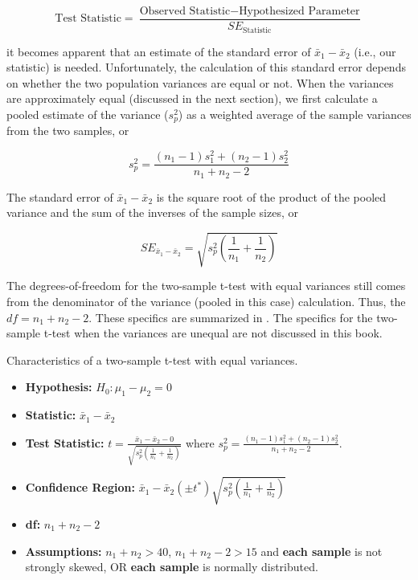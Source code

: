 \documentclass[10pt,openany]{book}\usepackage[]{graphicx}\usepackage[]{color}
\begin{document}
\[ \text{Test Statistic} = \frac{\text{Observed Statistic}-\text{Hypothesized Parameter}}{SE_{\text{Statistic}}} \]

it becomes apparent that an estimate of the standard error of $\bar{x}_{1}-\bar{x}_{2}$ (i.e., our statistic) is needed.  Unfortunately, the calculation of this standard error depends on whether the two population variances are equal or not.  When the variances are approximately equal (discussed in the next section), we first calculate a pooled estimate of the variance ($s_{p}^{2}$) as a weighted average of the sample variances from the two samples, or

\[s_{p}^{2}=\frac{(n_{1}-1)s_{1}^{2}+(n_{2}-1)s_{2}^{2}}{n_{1}+n_{2}-2} \]


The standard error of $\bar{x}_{1}-\bar{x}_{2}$ is the square root of the product of the pooled variance and the sum of the inverses of the sample sizes, or

\[ SE_{\bar{x}_{1}-\bar{x}_{2}}= \sqrt{s_{p}^{2}\left(\frac{1}{n_{1}}+\frac{1}{n_{2}} \right)}  \]

The degrees-of-freedom for the two-sample t-test with equal variances still comes from the denominator of the variance (pooled in this case) calculation. Thus, the $df=n_{1}+n_{2}-2$.  These specifics are summarized in . The specifics for the two-sample t-test when the variances are unequal are not discussed in this book.

\begin{table}[htbp]
  \caption{Characteristics of a two-sample t-test with equal variances.}
  \label{tab:2tspec}
    \begin{itemize}
      \item \textbf{Hypothesis:} $H_{0}:\mu_{1}-\mu_{2}=0$
      \item \textbf{Statistic:} $\bar{x}_{1}-\bar{x}_{2}$
      \item \textbf{Test Statistic:} $t=\frac{\bar{x}_{1}-\bar{x}_{2}-0}{\sqrt{s_{p}^{2}\left(\frac{1}{n_{1}}+\frac{1}{n_{2}} \right)}}$ where $s_{p}^{2}=\frac{(n_{1}-1)s_{1}^{2}+(n_{2}-1)s_{2}^{2}}{n_{1}+n_{2}-2}$.
      \item \textbf{Confidence Region:} $\bar{x}_{1}-\bar{x}_{2}(\pm t^{*})\sqrt{s_{p}^{2}\left(\frac{1}{n_{1}}+\frac{1}{n_{2}} \right)}$
      \item \textbf{df:} $n_{1}+n_{2}-2$
      \item \textbf{Assumptions:} $n_{1}+n_{2}>40$, $n_{1}+n_{2}-2>15$ and \textbf{each sample} is not strongly skewed, OR \textbf{each sample} is normally distributed.
    \end{itemize}
\end{table}
\end{document}
